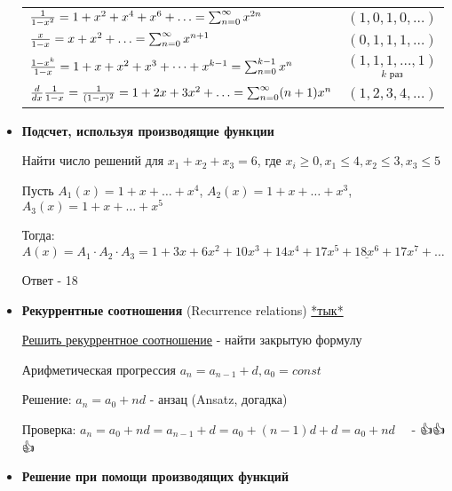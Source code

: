 \documentclass[12pt]{article}
\begin{document}
\begin{itemize}
{\begin{tabular}{p{}|p{}}
            $\frac{1}{1 - x^2} = 1 + x^2 + x^4 + x^6 + \dots \hfill = \sum_{n = 0}^\infty x^{2n}$ & $(1, 0, 1, 0, \dots)$ \\

            $\frac{x}{1 - x} = x + x^2 + \dots \hfill = \sum_{n = 0}^\infty x^{n + 1}$ & $(0, 1, 1, 1, \dots)$ \\

            $\frac{1 - x^k}{1 - x} = 1 + x + x^2 + x^3 + \dots + x^{k - 1} \hfill = \sum_{n = 0}^{k - 1} x^n$ & $\underset{k \text{ раз}}{(1, 1, 1, \dots, 1)}$ \\

            $\frac{d}{dx}\frac{1}{1 - x} = \frac{1}{(1 - x)^2} = 1 + 2x + 3x^2 + \dots \hfill = \sum_{n = 0}^{\infty} (n + 1) x^n$ & $(1, 2, 3, 4, \dots)$ \\\hline

        \end{tabular}
        }

        \vspace{2mm}

        \item \textbf{Подсчет, используя производящие функции}

        Найти число решений для $x_1 + x_2 + x_3 = 6$, где $x_i \geq 0, x_1 \leq 4, x_2 \leq 3, x_3 \leq 5$

        Пусть $A_1(x) = 1 + x + \dots + x^4$, $A_2(x) = 1 + x + \dots + x^3$, $A_3(x) = 1 + x + \dots + x^5$

        Тогда: $A(x) = A_1 \cdot A_2 \cdot A_3 = 1 + 3x + 6x^2 + 10x^3 + 14x^4 + 17x^5 + \underline{18x^6} + 17x^7 + \dots$

        Ответ - 18

        \item \textbf{Рекуррентные соотношения} (Recurrence relations)
        \hfill\href{https://ru.wikipedia.org/wiki/%D0%A0%D0%B5%D0%BA%D1%83%D1%80%D1%80%D0%B5%D0%BD%D1%82%D0%BD%D0%B0%D1%8F_%D1%84%D0%BE%D1%80%D0%BC%D1%83%D0%BB%D0%B0}{*тык*}


        \underline{Решить рекуррентное соотношение} - найти закрытую формулу

        \Exs Арифметическая прогрессия $a_n = a_{n - 1} + d, a_0 = const$

        Решение: $a_n = a_0 + nd$ - анзац (Ansatz, догадка)

        Проверка: $a_n = a_0 + nd = a_{n - 1} + d = a_0 + (n - 1)d + d = a_0 + nd \quad$ - {\Large👍👍👍}

        \item \textbf{Решение при помощи производящих функций}


\end{itemize}
\end{document}
